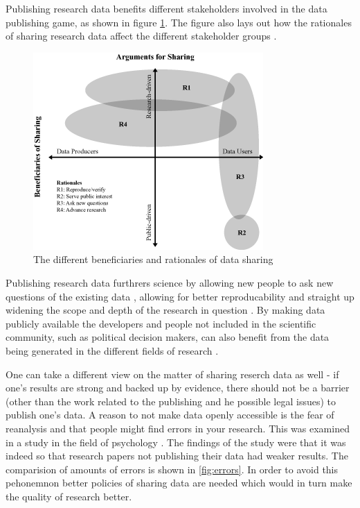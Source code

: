 Publishing research data benefits different stakeholders involved in the
data publishing game, as shown in figure \ref{fig:beneficaries}. The figure
also lays out how the rationales of sharing research data affect the different
stakeholder groups \cite{DBLP:journals/jasis/Borgman12}.

\begin{figure}
    \begin{centering}
        \includegraphics[width=\textwidth]{images/beneficaries}
    \end{centering}
    \caption{The different beneficiaries and rationales of data sharing \cite{DBLP:journals/jasis/Borgman12}}
    \label{fig:beneficaries}
\end{figure}

Publishing research data furthrers science by allowing new people to ask new
questions of the existing data \cite{whitlock2011data}, allowing for better
reproducability \cite{jasny2011again} and straight up widening the scope and
depth of the research in question \cite{DBLP:journals/see/FischerZ10}.
By making data publicly available the developers and people not included in the
scientific community, such as political decision makers, can also benefit from
the data being generated in the different fields of research
\cite{DBLP:journals/jasis/Borgman12}.

One can take a different view on the matter of sharing reserch data as well -
if one's results are strong and backed up by evidence, there should not be a
barrier (other than the work related to the publishing and he possible legal
issues) to publish one's data. A reason to not make data openly accessible is
the fear of reanalysis and that people might find errors in your research. This
was examined in a study in the field of psychology
\cite{wicherts2011willingness}. The findings of the study were that it was
indeed so that research papers not publishing their data had weaker results.
The comparision of amounts of errors is shown in \ref{fig:errors}. In order
to avoid this pehonemnon better policies of sharing data are needed which would
in turn make the quality of research better.

